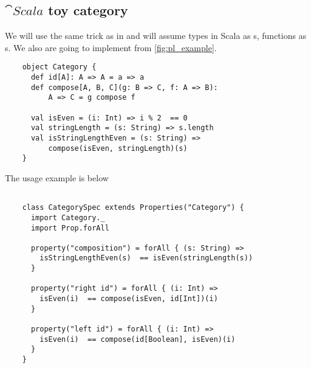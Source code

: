 \subsection{$\cat{Scala}$ toy category}
\begin{example}
  \label{ex:scalacategory}

  We will use the same trick as in  and
  will assume 
  types in Scala as s, 
  functions as s.
  We also are going to implement
   from \cref{fig:pl_example}.

  \begin{verbatim}
    object Category {
      def id[A]: A => A = a => a
      def compose[A, B, C](g: B => C, f: A => B): 
          A => C = g compose f 
      
      val isEven = (i: Int) => i % 2  == 0
      val stringLength = (s: String) => s.length
      val isStringLengthEven = (s: String) => 
          compose(isEven, stringLength)(s)
    }
  \end{verbatim}

  The usage example is below
  \begin{verbatim}
    
    class CategorySpec extends Properties("Category") {
      import Category._
      import Prop.forAll
      
      property("composition") = forAll { (s: String) =>
        isStringLengthEven(s)  == isEven(stringLength(s))
      }
      
      property("right id") = forAll { (i: Int) =>
        isEven(i)  == compose(isEven, id[Int])(i)
      }
      
      property("left id") = forAll { (i: Int) =>
        isEven(i)  == compose(id[Boolean], isEven)(i)
      }
    }
  \end{verbatim}
\end{example}


